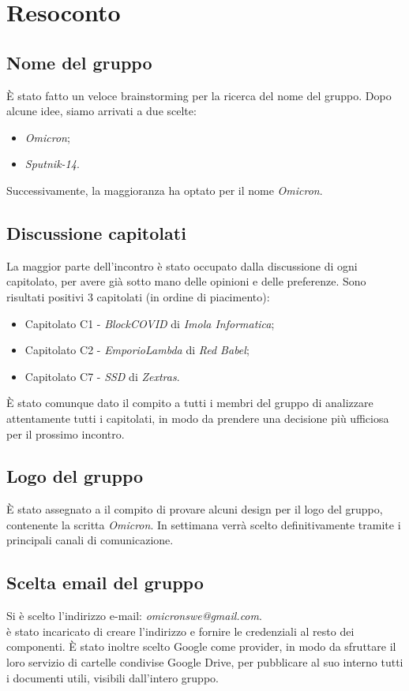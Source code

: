 \section{Resoconto}
	\subsection{Nome del gruppo}
	È stato fatto un veloce brainstorming per la ricerca del nome del gruppo. Dopo alcune idee, siamo arrivati a due scelte:
	\begin{itemize}
	\item \textit{Omicron};
	\item \textit{Sputnik-14}.
	\end{itemize}
	Successivamente, la maggioranza ha optato per il nome \textit{Omicron}.
	
	\subsection{Discussione capitolati}
	La maggior parte dell'incontro è stato occupato dalla discussione di ogni capitolato, per avere già sotto mano delle opinioni e delle preferenze. Sono risultati positivi 3 capitolati (in ordine di piacimento):
	\begin{itemize}
		\item Capitolato C1 - \textit{BlockCOVID} di \textit{Imola Informatica};
		\item Capitolato C2 - \textit{EmporioLambda} di \textit{Red Babel};
		\item Capitolato C7 - \textit{SSD} di \textit{Zextras}.
	\end{itemize}
	È stato comunque dato il compito a tutti i membri del gruppo di analizzare attentamente tutti i capitolati, in modo da prendere una decisione più ufficiosa per il prossimo incontro.
	
	\subsection{Logo del gruppo}
	È stato assegnato a \NM{} il compito di provare alcuni design per il logo del gruppo, contenente la scritta \textit{Omicron}. In settimana verrà scelto definitivamente tramite i principali canali di comunicazione.
	
	\subsection{Scelta email del gruppo}
	Si è scelto l'indirizzo e-mail: \textit{omicronswe@gmail.com}.\\
	\MDI{} è stato incaricato di creare l'indirizzo e fornire le credenziali al resto dei componenti. È stato inoltre scelto Google come provider, in modo da sfruttare il loro servizio di cartelle condivise Google Drive, per pubblicare al suo interno tutti i documenti utili, visibili dall'intero gruppo.
	
